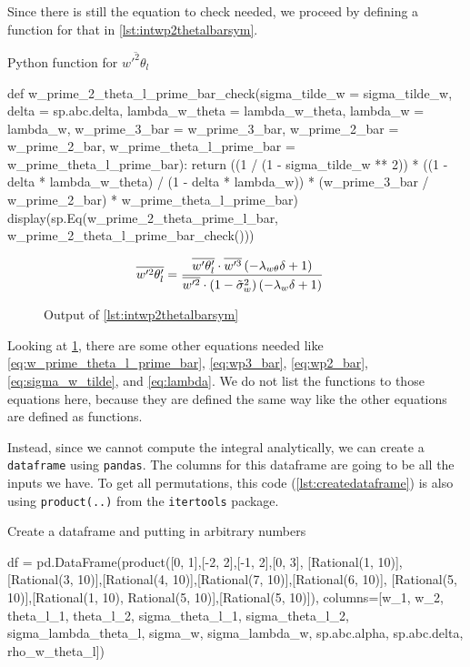 Since there is still the equation to check needed, 
we proceed by defining a function for that in \cref{lst:intwp2thetalbarsym}.
\begin{listing}[!ht]
    \caption{Python function for $\overline{w'^2\theta_l}$}
    \label{lst:intwp2thetalbarsym}
    \begin{pythoncode}
        def w_prime_2_theta_l_prime_bar_check(sigma_tilde_w = sigma_tilde_w, 
            delta = sp.abc.delta, lambda_w_theta = lambda_w_theta, lambda_w = lambda_w, 
            w_prime_3_bar = w_prime_3_bar, w_prime_2_bar = w_prime_2_bar, 
            w_prime_theta_l_prime_bar = w_prime_theta_l_prime_bar):
            return ((1 / (1 - sigma_tilde_w ** 2)) *
                ((1 - delta * lambda_w_theta) / (1 - delta * lambda_w)) *
                (w_prime_3_bar / w_prime_2_bar) *
                w_prime_theta_l_prime_bar)
        display(sp.Eq(w_prime_2_theta_prime_l_bar, w_prime_2_theta_l_prime_bar_check()))
    \end{pythoncode}
\end{listing}
\begin{figure}[!ht]
    \centering
    \caption{Output of \cref{lst:intwp2thetalbarsym}}
    \label{fig:intwp2thetalbarsymout}
    \begin{align}
        \nonumber
        \overline{w'^2\theta'_l}
        &= \frac{\overline{w'\theta'_l} \cdot \overline{w'^3} \left(- \lambda_{w\theta} \delta + 1\right)}{\overline{w'^2} \cdot \left(1 - \Tilde{\sigma}_w^{2}\right) \left(- \lambda_{w} \delta + 1\right)}
    \end{align}
\end{figure}
Looking at \cref{fig:intwp2thetalbarsymout}, 
there are some other equations needed like \cref{eq:w_prime_theta_l_prime_bar}, 
\cref{eq:wp3_bar}, \cref{eq:wp2_bar}, \cref{eq:sigma_w_tilde}, and \cref{eq:lambda}.
We do not list the functions to those equations here, 
because they are defined the same way like the other equations are defined as functions.

Instead, since we cannot compute the integral analytically, 
we can create a \texttt{dataframe} 
using \texttt{pandas}\autocite{mckinney-proc-scipy-2010}.
The columns for this dataframe are going to be all the inputs we have.
To get all permutations, 
this code (\cref{lst:createdataframe}) is also using \texttt{product(..)} 
from the \texttt{itertools} package.
\begin{listing}[!ht]
    \caption{Create a dataframe and putting in arbitrary numbers}
    \label{lst:createdataframe}
    \begin{pythoncode}
        df = pd.DataFrame(product([0, 1],[-2, 2],[-1, 2],[0, 3], [Rational(1, 10)],
            [Rational(3, 10)],[Rational(4, 10)],[Rational(7, 10)],[Rational(6, 10)],
            [Rational(5, 10)],[Rational(1, 10), Rational(5, 10)],[Rational(5, 10)]),
            columns=[w_1, w_2, theta_l_1, theta_l_2, sigma_theta_l_1, sigma_theta_l_2, 
            sigma_lambda_theta_l, sigma_w, sigma_lambda_w, sp.abc.alpha, sp.abc.delta,
            rho_w_theta_l])
    \end{pythoncode}
\end{listing}

